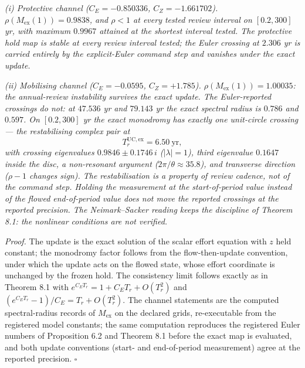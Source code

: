 \documentclass[11pt]{article}
\begin{document}
\emph{(i) Protective channel (\(C_E = -0.850336\), \(C_Z = -1.661702\)).
\(\rho(M_{\mathrm{ex}}(1)) = 0.9838\), and \(\rho < 1\) at every tested
review interval on \([0.2, 300]\) yr, with maximum \(0.9967\) attained
at the shortest interval tested. The protective hold map is stable at
every review interval tested; the Euler crossing at \(2.306\) yr is
carried entirely by the explicit-Euler command step and vanishes under
the exact update.}

\emph{(ii) Mobilising channel (\(C_E = -0.0595\), \(C_Z = +1.785\)).
\(\rho(M_{\mathrm{ex}}(1)) = 1.00035\): the annual-review instability
survives the exact update. The Euler-reported crossings do not: at
\(47.536\) yr and \(79.143\) yr the exact spectral radius is \(0.786\)
and \(0.597\). On \([0.2, 300]\) yr the exact monodromy has exactly one
unit-circle crossing --- the restabilising complex pair at}
\[T_r^{\mathrm{UC,ex}} = 6.50\ \mathrm{yr},\] \emph{with crossing
eigenvalues \(0.9846 \pm 0.1746\,i\) (\(|\lambda| = 1\)), third
eigenvalue \(0.1647\) inside the disc, a non-resonant argument
(\(2\pi/\theta \approx 35.8\)), and transverse direction (\(\rho - 1\)
changes sign). The restabilisation is a property of review cadence, not
of the command step. Holding the measurement at the start-of-period
value instead of the flowed end-of-period value does not move the
reported crossings at the reported precision. The Neimark--Sacker
reading keeps the discipline of Theorem 8.1: the nonlinear conditions
are not verified.}

\emph{Proof.} The update is the exact solution of the scalar effort
equation with \(z\) held constant; the monodromy factor follows from the
flow-then-update convention, under which the update acts on the flowed
state, whose effort coordinate is unchanged by the frozen hold. The
consistency limit follows exactly as in Theorem 8.1 with
\(e^{C_E T_r} = 1 + C_E T_r + O(T_r^2)\) and
\((e^{C_E T_r} - 1)/C_E = T_r + O(T_r^2)\). The channel statements are
the computed spectral-radius records of \(M_{\mathrm{ex}}\) on the
declared grids, re-executable from the registered model constants; the
same computation reproduces the registered Euler numbers of Proposition
6.2 and Theorem 8.1 before the exact map is evaluated, and both update
conventions (start- and end-of-period measurement) agree at the reported
precision. \ensuremath{\square}
\end{document}
